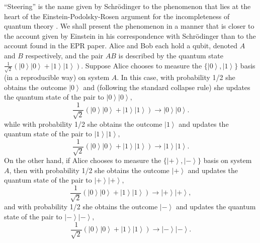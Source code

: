 \documentclass[pra,nofootinbib,showpacs,12pt]{revtex4}
\begin{document}
``Steering'' is the name given by Schr\"{o}dinger to the phenomenon that
lies at the heart of the Einstein-Podolsky-Rosen argument for the
incompleteness of quantum theory \cite{EPR}. We shall present the phenomenon
in a manner that is closer to the account given by Einstein in his
correspondence with Schr\"{o}dinger \cite{Einsteinletters} than to the
account found in the EPR paper. Alice and Bob each hold a qubit, denoted $A$
and $B$ respectively, and the pair $AB$ is described by the quantum state $%
\frac{1}{\sqrt{2}}\left( \left| 0\right\rangle \left| 0\right\rangle +\left|
1\right\rangle \left| 1\right\rangle \right) .$ Suppose Alice chooses to
measure the $\{\left| 0\right\rangle ,\left| 1\right\rangle \}$ basis (in a
reproducible way) on system $A.$ In this case, with probability 1/2 she
obtains the outcome $\left| 0\right\rangle $ and (following the standard
collapse rule) she updates the quantum state of the pair to $\left|
0\right\rangle \left| 0\right\rangle ,$%
\begin{equation}
\frac{1}{\sqrt{2}}\left( \left| 0\right\rangle \left| 0\right\rangle +\left|
1\right\rangle \left| 1\right\rangle \right) \rightarrow \left|
0\right\rangle \left| 0\right\rangle .  \label{rsq1}
\end{equation}
while with probability 1/2 she obtains the outcome $\left| 1\right\rangle $
and updates the quantum state of the pair to $\left| 1\right\rangle \left|
1\right\rangle ,$%
\begin{equation}
\frac{1}{\sqrt{2}}\left( \left| 0\right\rangle \left| 0\right\rangle +\left|
1\right\rangle \left| 1\right\rangle \right) \rightarrow \left|
1\right\rangle \left| 1\right\rangle .  \label{rsq2}
\end{equation}
On the other hand, if Alice chooses to measure the $\{\left| +\right\rangle
,\left| -\right\rangle \}$ basis on system $A$, then with probability 1/2
she obtains the outcome $\left| +\right\rangle $ and updates the quantum
state of the pair to $\left| +\right\rangle \left| +\right\rangle ,$%
\begin{equation}
\frac{1}{\sqrt{2}}\left( \left| 0\right\rangle \left| 0\right\rangle +\left|
1\right\rangle \left| 1\right\rangle \right) \rightarrow \left|
+\right\rangle \left| +\right\rangle ,  \label{rsq3}
\end{equation}
and with probability 1/2 she obtains the outcome $\left| -\right\rangle $
and updates the quantum state of the pair to $\left| -\right\rangle \left|
-\right\rangle ,$%
\begin{equation}
\frac{1}{\sqrt{2}}\left( \left| 0\right\rangle \left| 0\right\rangle +\left|
1\right\rangle \left| 1\right\rangle \right) \rightarrow \left|
-\right\rangle \left| -\right\rangle .  \label{rsq4}
\end{equation}
\end{document}
